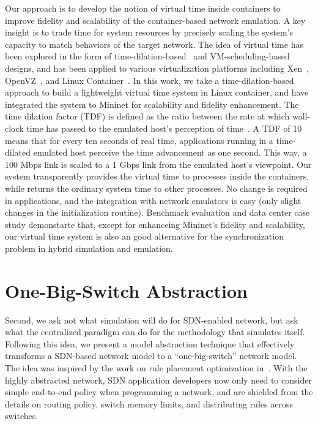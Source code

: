 Our approach is to develop the notion of virtual time inside containers to improve fidelity and scalability of the container-based network emulation.
A key insight is to trade time for system resources by precisely scaling the system's capacity to match behaviors of the target network.
The idea of virtual time has been explored in the form of time-dilation-based~\cite{ToInfinityBeyond} and
VM-scheduling-based~\cite{VirtTimeOpenVZ, SliceTime} designs, and has been applied to various virtualization platforms including Xen~\cite{DieCast},
OpenVZ~\cite{VirtTimeOpenVZ}, and Linux Container~\cite{TimeKeeper}.
In this work, we take a time-dilation-based approach to build a lightweight virtual time system in Linux container,
and have integrated the system to Mininet for scalability and fidelity enhancement.
The time dilation factor (TDF) is defined as the ratio between the rate at which wall-clock time has
passed to the emulated host's perception of time~\cite{ToInfinityBeyond}.
A TDF of 10 means that for every ten seconds of real time, applications running in a time-dilated emulated host perceive the time advancement as one second.
This way, a 100 Mbps link is scaled to a 1 Gbps link from the emulated host's viewpoint.
Our system transparently provides the virtual time to processes inside the containers,
while returns the ordinary system time to other processes.
No change is required in applications, and the integration with network emulators is easy (only slight changes in the initialization routine).
Benchmark evaluation and data center case study demonstarte that, except for enhanceing Mininet's fidelity and scalability,
our virtual time system is also an good alternative for the synchronization problem in hybrid simulation and emulation.

\section{One-Big-Switch Abstraction}
Second, we ask not what simulation will do for SDN-enabled network, but ask what the centralized paradigm can do for the methodology that simulates itself.
Following this idea, we present a model abstraction technique that effectively transforms
a SDN-based network model to a ``one-big-switch'' network model.
The idea was inspired by the work on rule placement optimization in~\cite{OneBigSwitchAbstraction}.
With the highly abstracted network, SDN application developers now only need to consider
simple end-to-end policy when programming a network,
and are shielded from the details on routing policy, switch memory limits,
and distributing rules across switches.

